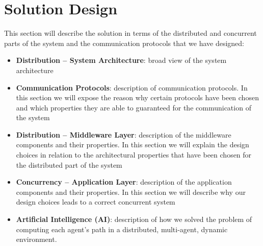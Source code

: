 \section{Solution Design}

This section will describe the solution in terms of the distributed and
concurrent parts of the system and the communication protocols that we have
designed:

\begin{itemize}
\item \textbf{Distribution -- System Architecture}:
  broad view of the system architecture
\item \textbf{Communication Protocols}:
  description of communication protocols. In this section we will expose the
  reason why certain protocols have been chosen and which properties they are
  able to guaranteed for the communication of the system
\item \textbf{Distribution -- Middleware Layer}:
  description of the middleware components and their properties. In this
  section we will explain the design choices in relation to the architectural
  properties that have been chosen for the distributed part of the system
\item \textbf{Concurrency -- Application Layer}:
  description of the application components and their properties. In this
  section we will describe why our design choices leads to a correct concurrent
  system
\item \textbf{Artificial Intelligence (AI)}:
  description of how we solved the problem of computing each agent's path
  in a distributed, multi-agent, dynamic environment.
\end{itemize}










